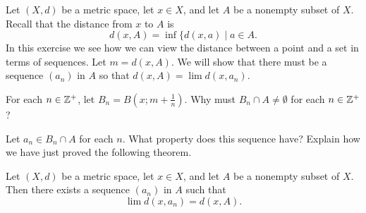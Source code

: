 \begin{comment}

\ExerciseSolution

\ba

\item Assume that $A$ is bounded above so that $s = \sup(A)$ exists. Let $n \in \Z^+$. Since $s-\frac{1}{n} < s$, we know that $s-\frac{1}{n}$ is not an upper bound for $A$. So there exists $a_n \in A$ such that $s-\frac{1}{n} < a_n \leq s$. Given any $\epsilon > 0$, there exists $N \in \Z^+$ such that $\frac{1}{N} < \epsilon$. So if $n \geq N$, then $|a_n - s| < \frac{1}{n} < \frac{1}{N} < \epsilon$. We conclude that $\lim a_n = s$. 

\item Assume that $A$ is bounded above so that $t = \inf(A)$ exists. Let $n \in \Z^+$. Since $t+\frac{1}{n} < t$, we know that $t+\frac{1}{n}$ is not a lower bound for $A$. So there exists $a_n \in A$ such that $t \leq a_n < t+\frac{1}{n}$. Given any $\epsilon > 0$, there exists $N \in \Z^+$ such that $\frac{1}{N} < \epsilon$. So if $n \geq N$, then $|a_n - t| < \frac{1}{n} < \frac{1}{N} < \epsilon$. We conclude that $\lim a_n = t$. 

\item Let $A$ be the open interval $(0,1)$ in $\R$ with the Euclidean metric.  Then $\sup(A) = 1$ and $\inf(A) = 0$. So neither limit needs to be in $A$.  
\ea

\end{comment}

\item Let $(X,d)$ be a metric space, let $x \in X$, and let $A$ be a nonempty subset of $X$. Recall that the distance from $x$ to $A$ is 
\[d(x,A) = \inf \{d(x,a) \mid a \in A.\]
In this exercise we see how we can view the distance between a point and a set in terms of sequences. Let $m = d(x,A)$. We will show that there must be a sequence $(a_n)$ in $A$ so that $d(x,A) = \lim d(x,a_n)$. 
\ba
\item For each $n \in \mathbb{Z}^+$, let $B_n = B\left(x;m+\frac{1}{n}\right)$. Why must $B_n \cap A \neq \emptyset$ for each $n \in \mathbb{Z}^+$? 

\item Let $a_n \in B_n \cap A$ for each $n$. What property does this sequence have? Explain how we have just proved the following theorem.

\begin{theorem} Let $(X,d)$ be a metric space, let $x \in X$, and let $A$ be a nonempty subset of $X$. Then there exists a sequence $(a_n)$ in $A$ such that 
\[\lim d(x,a_n) = d(x,A).\]
\end{theorem}

